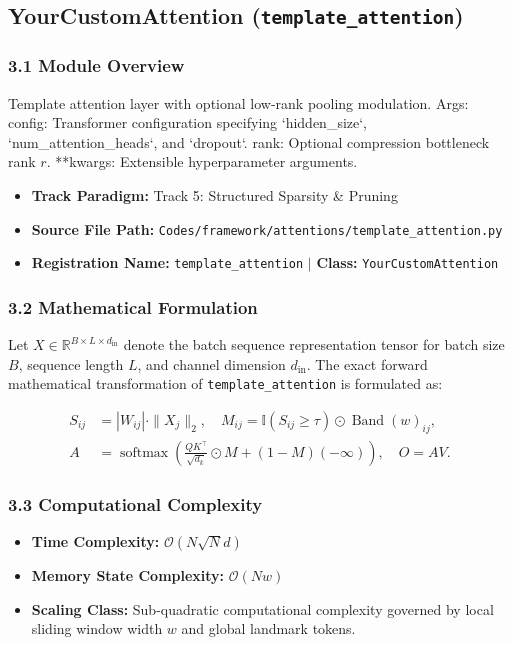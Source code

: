 \subsection{YourCustomAttention (\texttt{template\_attention})}
\label{sec:app_module_template\_attention}

\subsubsection*{3.1 Module Overview}
Template attention layer with optional low-rank pooling modulation.  Args:     config: Transformer configuration specifying `hidden\_size`, `num\_attention\_heads`, and `dropout`.     rank: Optional compression bottleneck rank $r$.     **kwargs: Extensible hyperparameter arguments.
\begin{itemize}
    \item \textbf{Track Paradigm:} Track 5: Structured Sparsity & Pruning
    \item \textbf{Source File Path:} \texttt{Codes/framework/attentions/template\_attention.py}
    \item \textbf{Registration Name:} \texttt{template\_attention} $\mid$ \textbf{Class:} \texttt{YourCustomAttention}
\end{itemize}

\subsubsection*{3.2 Mathematical Formulation}
Let $X \in \mathbb{R}^{B \times L \times d_{\text{in}}}$ denote the batch sequence representation tensor for batch size $B$, sequence length $L$, and channel dimension $d_{\text{in}}$. The exact forward mathematical transformation of \texttt{template\_attention} is formulated as:

\begin{align}
S_{ij} &= |W_{ij}| \cdot \|X_j\|_2, \quad M_{ij} = \mathbb{I}(S_{ij} \ge \tau) \odot \operatorname{Band}(w)_{ij}, \\
A &= \operatorname{softmax}\left(\frac{Q K^\top}{\sqrt{d_k}} \odot M + (1 - M)(-\infty)\right), \quad O = A V.
\end{align}


\subsubsection*{3.3 Computational Complexity}
\begin{itemize}
    \item \textbf{Time Complexity:} $\mathcal{O}(N \sqrt{N} d)$
    \item \textbf{Memory State Complexity:} $\mathcal{O}(N w)$
    \item \textbf{Scaling Class:} Sub-quadratic computational complexity governed by local sliding window width $w$ and global landmark tokens.
\end{itemize}

